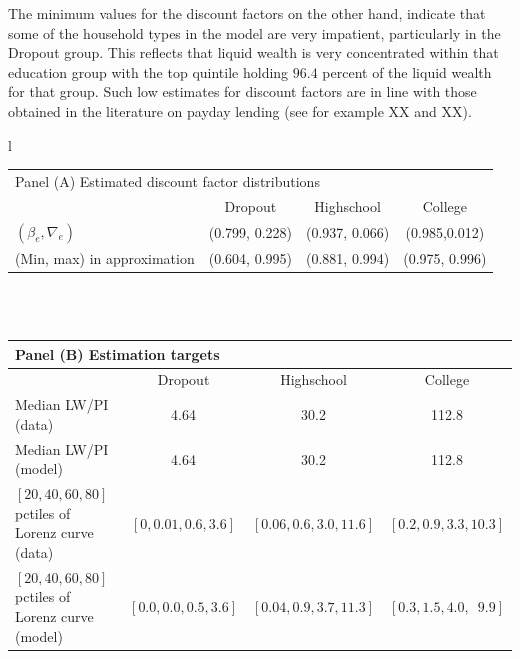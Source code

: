\documentclass[11pt]{article}
\begin{document}
The minimum values for the discount factors on the other hand, indicate that some of the household types in the model are very impatient, particularly in the Dropout group. This reflects that liquid wealth is very concentrated within that education group with the top quintile holding $96.4$ percent of the liquid wealth for that group. Such low estimates for discount factors are in line with those obtained in the literature on payday lending (see for example XX and XX). 

\begin{table}[th]
\begin{center}
\begin{tabular}{l}
	\begin{tabular}{lccc}
		\multicolumn{4}{l}{Panel (A) Estimated discount factor distributions} \\ 
		& Dropout & Highschool & College \\ \midrule
		$(\beta_e, \nabla_e)$ & (0.799, 0.228) & (0.937, 0.066) & (0.985,0.012) \\
		(Min, max) in approximation & (0.604, 0.995) & (0.881, 0.994) & (0.975, 0.996) \\
		\midrule 
	\end{tabular} \\ \\ 

	\begin{tabular}{lccc}
	\multicolumn{4}{l}{Panel (B) Estimation targets} \\ \midrule
	& Dropout & Highschool & College \\ \midrule
	Median LW/PI (data) & 4.64 & 30.2 & 112.8 \\ 
	Median LW/PI (model) & 4.64 & 30.2 & 112.8 \\
	 $[20,40,60,80]$ pctiles of Lorenz curve (data) & $[0, 0.01, 0.6, 3.6]$ & $[0.06, 0.6, 3.0, 11.6]$ & $[0.2, 0.9, 3.3, 10.3]$ \\
	$[20,40,60,80]$ pctiles of Lorenz curve (model) & $[0.0, 0.0, 0.5, 3.6]$ & $[0.04, 0.9, 3.7, 11.3]$ & $[0.3, 1.5, 4.0, \phantom{0}9.9]$
	\\ \midrule 
	\end{tabular} \\ \\ 


\end{tabular}
\end{center}
\end{table}
\end{document}
